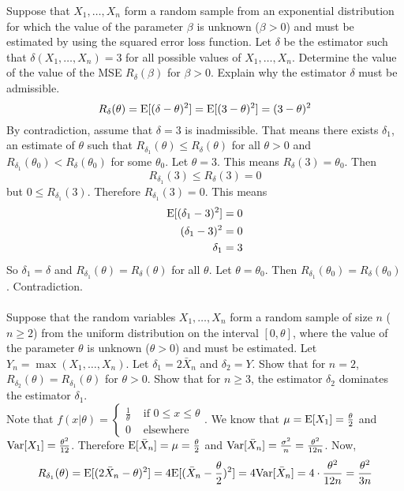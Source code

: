 \documentclass[12pt]{article}
\begin{document}
Suppose that $X_1,\dots,X_n$ form a random sample from an exponential distribution for which the value of the parameter $\beta$ is unknown ($\beta > 0$) and must be estimated by using the squared error loss function. Let $\delta$ be the estimator such that $\delta(X_1,\dots,X_n) = 3$ for all possible values of $X_1,\dots,X_n$. Determine the value of the value of the MSE $R_\delta(\beta)$ for $\beta > 0$. Explain why the estimator $\delta$ must be admissible. \\ 
$$R_\delta(\theta) = \mathrm{E}[ (\delta - \theta)^2 ] = \mathrm{E}[ (3-\theta)^2 ] = (3-\theta)^2$$
By contradiction, assume that $\delta = 3$ is inadmissible. That means there exists $\delta_1$, an estimate of $\theta$ such that $R_{\delta_1}(\theta) \leq R_\delta(\theta)$ for all $\theta > 0$ and $R_{\delta_1}(\theta_0) < R_\delta(\theta_0)$ for some $\theta_0$. Let $\theta = 3$. This means $R_\delta(3) = \theta_0$. Then $$R_{\delta_1}(3) \leq R_\delta(3) = 0$$ but $ 0 \leq R_{\delta_1}(3)$. Therefore $R_{\delta_1}(3) = 0$. This means $$ \begin{aligned} \mathrm{E}[ (\delta_1 - 3)^2 ] &= 0 \\ (\delta_1 - 3)^2 &= 0 \\ \delta_1 &= 3 \end{aligned} $$ 
So $\delta_1 = \delta$ and $R_{\delta_1}(\theta) = R_\delta(\theta)$ for all $\theta$. Let $\theta = \theta_0$. Then $R_{\delta_1}(\theta_0) = R_\delta(\theta_0)$. Contradiction. \\~\\
Suppose that the random variables $X_1,\dots,X_n$ form a random sample of size $n$ ($n \geq 2$) from the uniform distribution on the interval $[0,\theta]$, where the value of the parameter $\theta$ is unknown ($\theta > 0$) and must be estimated. Let $Y_n = \max(X_1,\dots,X_n)$. Let $\delta_1 = 2\bar{X}_n$ and $\delta_2 = Y$. Show that for $n = 2$, $R_{\delta_2}(\theta) = R_{\delta_1}(\theta)$ for $\theta > 0$. Show that for $n\geq 3$, the estimator $\delta_2$ dominates the estimator $\delta_1$. \\ 
Note that $f(x|\theta) = \begin{cases} \frac{1}{\theta} &\text{ if } 0 \leq x \leq \theta \\ 0 &\text{ elsewhere} \end{cases} $. We know that $\mu = \mathrm{E}[ X_1 ] = \frac{\theta}{2}$ and $\mathrm{Var}[ X_1 ] = \frac{\theta^2}{12}$. Therefore $\mathrm{E}[ \bar{X}_n ] = \mu = \frac{\theta}{2}$ and $\mathrm{Var}[ \bar{X}_n ] = \frac{\sigma^2}{n} = \frac{\theta^2}{12n}$. Now, $$ R_{\delta_1}(\theta) = \mathrm{E}[ (2\bar{X}_n - \theta)^2 ] = 4 \mathrm{E}[ (\bar{X}_n - \frac{\theta}{2})^2 ] = 4\mathrm{Var}[ \bar{X}_n ] = 4 \cdot \frac{\theta^2}{12n} = \frac{\theta^2}{3n} $$ 
\end{document}
